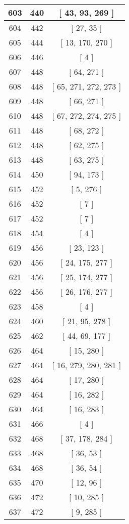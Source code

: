 \begin{center}
\begin{longtable}[H]{|| c c c ||}
\hline
603 & 440 & [ 43, 93, 269 ] \\ 
\hline
604 & 442 & [ 27, 35 ] \\ 
\hline
605 & 444 & [ 13, 170, 270 ] \\ 
\hline
606 & 446 & [ 4 ] \\ 
\hline
607 & 448 & [ 64, 271 ] \\ 
\hline
608 & 448 & [ 65, 271, 272, 273 ] \\ 
\hline
609 & 448 & [ 66, 271 ] \\ 
\hline
610 & 448 & [ 67, 272, 274, 275 ] \\ 
\hline
611 & 448 & [ 68, 272 ] \\ 
\hline
612 & 448 & [ 62, 275 ] \\ 
\hline
613 & 448 & [ 63, 275 ] \\ 
\hline
614 & 450 & [ 94, 173 ] \\ 
\hline
615 & 452 & [ 5, 276 ] \\ 
\hline
616 & 452 & [ 7 ] \\ 
\hline
617 & 452 & [ 7 ] \\ 
\hline
618 & 454 & [ 4 ] \\ 
\hline
619 & 456 & [ 23, 123 ] \\ 
\hline
620 & 456 & [ 24, 175, 277 ] \\ 
\hline
621 & 456 & [ 25, 174, 277 ] \\ 
\hline
622 & 456 & [ 26, 176, 277 ] \\ 
\hline
623 & 458 & [ 4 ] \\ 
\hline
624 & 460 & [ 21, 95, 278 ] \\ 
\hline
625 & 462 & [ 44, 69, 177 ] \\ 
\hline
626 & 464 & [ 15, 280 ] \\ 
\hline
627 & 464 & [ 16, 279, 280, 281 ] \\ 
\hline
628 & 464 & [ 17, 280 ] \\ 
\hline
629 & 464 & [ 16, 282 ] \\ 
\hline
630 & 464 & [ 16, 283 ] \\ 
\hline
631 & 466 & [ 4 ] \\ 
\hline
632 & 468 & [ 37, 178, 284 ] \\ 
\hline
633 & 468 & [ 36, 53 ] \\ 
\hline
634 & 468 & [ 36, 54 ] \\ 
\hline
635 & 470 & [ 12, 96 ] \\ 
\hline
636 & 472 & [ 10, 285 ] \\ 
\hline
637 & 472 & [ 9, 285 ] \\ 

\end{longtable}
\end{center}
